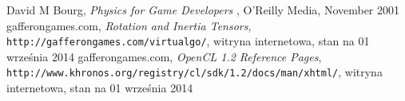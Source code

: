 \begin{thebibliography}{999}

 David M Bourg, \emph{Physics for Game Developers }, O'Reilly Media, November 2001
gafferongames.com, \emph{Rotation and Inertia Tensors}, \texttt{http://gafferongames.com/virtualgo/}, witryna internetowa, stan na 01 września 2014
gafferongames.com, \emph{OpenCL 1.2 Reference Pages}, \texttt{http://www.khronos.org/registry/cl/sdk/1.2/docs/man/xhtml/}, witryna internetowa, stan na 01 września 2014
\end{thebibliography}
